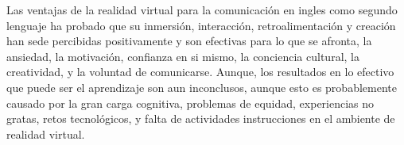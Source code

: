 Las ventajas de la realidad virtual para la comunicación en ingles como segundo lenguaje ha probado que su inmersión, interacción, retroalimentación y creación han sede percibidas positivamente y son efectivas para lo que se afronta, la ansiedad, la motivación, confianza en si mismo, la conciencia cultural, la creatividad, y la voluntad de comunicarse. Aunque, los resultados en lo efectivo que puede ser el aprendizaje son aun inconclusos, aunque esto es probablemente causado por la gran carga cognitiva, problemas de equidad, experiencias no gratas, retos tecnológicos, y falta de actividades instrucciones en el ambiente de realidad virtual. \cite{YUDINTSEVA2023100018}

